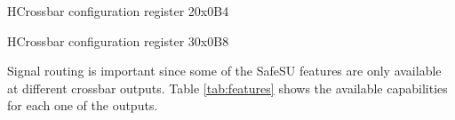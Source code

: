  \begin{register}{H}{Crossbar configuration register 2}{0x0B4}
	\label{cross_cfg2}
	\regnewline
\end{register}

 \begin{register}{H}{Crossbar configuration register 3}{0x0B8}
	\label{cross_cfg3}
	\regnewline
\end{register}
Signal routing is important since some of the SafeSU features are only available at different crossbar outputs. Table \ref{tab:features} shows the available capabilities for each one of the outputs.\\
